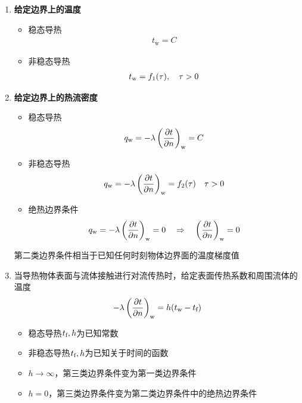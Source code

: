 \begin{enumerate}
	\item \textbf{给定边界上的温度}
	\begin{itemize}
		\item 稳态导热\vspace*{-1em}
		\begin{align}
			t_\text{w} = C
		\end{align}
		\vspace*{-2em}
		\item 非稳态导热\vspace*{-1em}
		\begin{align}
			t_{\text{w}} = f_1(\tau), \quad \tau > 0
		\end{align}
	\end{itemize}
	
	\item \textbf{给定边界上的热流密度}
	\begin{itemize}
		\item 稳态导热\vspace*{-1em}
		\begin{align}
			q_{\text{w}} = - \lambda \left(\dfrac{\partial t}{\partial n}\right)_{\text{w}} = C
		\end{align}
		\vspace*{-2em}
		\item 非稳态导热\vspace*{-1em}
		\begin{align}
			q_{\text{w}} = - \lambda \left(\dfrac{\partial t}{\partial n}\right)_{\text{w}} =f_2(\tau)\quad \tau > 0
		\end{align}
		\vspace*{-2em}
		\item 绝热边界条件\vspace*{-1em}
		\begin{align}
			q_{\text{w}} = - \lambda \left(\dfrac{\partial t}{\partial n}\right)_{\text{w}} = 0 \quad \Rightarrow \quad  \left(\dfrac{\partial t}{\partial n}\right)_{\text{w}} = 0
		\end{align}
	\end{itemize}
	第二类边界条件相当于已知任何时刻物体边界面的温度梯度值
	
	\item 当导热物体表面与流体接触进行对流传热时，给定表面传热系数和周围流体的温度
	\begin{align}
		- \lambda \left(\dfrac{\partial t}{\partial n}\right)_{\text{w}} = h(t_{\text{w}} - t_{\text{f}})
	\end{align}
	\begin{itemize}
		\item 稳态导热\quad $t_{\text{f}} , h$为已知常数\vspace*{-0.5em}
		\item 非稳态导热\quad $t_{\text{f}} , h$为已知关于时间的函数\vspace*{-0.5em}
		\item $h \to \infty$，第三类边界条件变为第一类边界条件\vspace*{-0.5em}
		\item $h = 0$，第三类边界条件变为第二类边界条件中的绝热边界条件
	\end{itemize}
\end{enumerate}
